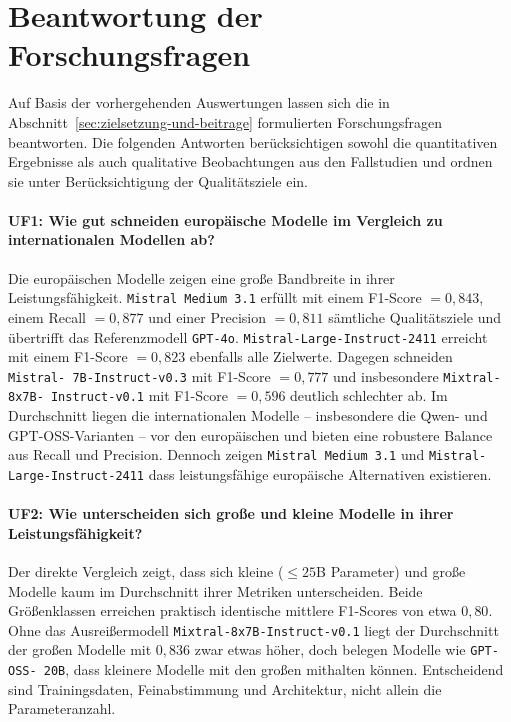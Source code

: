 \section{Beantwortung der Forschungsfragen}\label{sec:antworten-auf-forschungsfragen}

Auf Basis der vorhergehenden Auswertungen lassen sich die in Abschnitt~\ref{sec:zielsetzung-und-beitrage} formulierten Forschungsfragen beantworten. Die folgenden Antworten berücksichtigen sowohl die quantitativen Ergebnisse als auch qualitative Beobachtungen aus den Fallstudien und ordnen sie unter Berücksichtigung der Qualitätsziele ein.

\paragraph{UF1: Wie gut schneiden europäische Modelle im Vergleich zu internationalen Modellen ab?}

Die europäischen Modelle zeigen eine große Bandbreite in ihrer Leistungsfähigkeit. \texttt{Mistral Medium 3.1} erfüllt mit einem F1-Score $= 0{,}843$, einem Recall $= 0{,}877$ und einer Precision $= 0{,}811$ sämtliche Qualitätsziele und übertrifft das Referenzmodell \texttt{GPT-4o}. \texttt{Mistral-Large-Instruct-2411} erreicht mit einem F1-Score $= 0{,}823$ ebenfalls alle Zielwerte. Dagegen schneiden \texttt{Mistral-\linebreak~7B-Instruct-v0.3} mit F1-Score $= 0{,}777$ und insbesondere \texttt{Mixtral-8x7B-\linebreak~Instruct-v0.1} mit F1-Score $= 0{,}596$ deutlich schlechter ab. Im Durchschnitt liegen die internationalen Modelle – insbesondere die Qwen- und GPT-OSS-Varianten – vor den europäischen und bieten eine robustere Balance aus Recall und Precision. Dennoch zeigen \texttt{Mistral Medium 3.1} und \texttt{Mistral-Large-Instruct-2411} dass leistungsfähige europäische Alternativen existieren.

\paragraph{UF2: Wie unterscheiden sich große und kleine Modelle in ihrer Leistungsfähigkeit?}

Der direkte Vergleich zeigt, dass sich kleine ($\leq 25$B Parameter) und große Modelle kaum im Durchschnitt ihrer Metriken unterscheiden. Beide Größenklassen erreichen praktisch identische mittlere F1-Scores von etwa $0{,}80$. Ohne das Ausreißermodell \texttt{Mixtral-8x7B-Instruct-v0.1} liegt der Durchschnitt der großen Modelle mit $0{,}836$ zwar etwas höher, doch belegen Modelle wie \texttt{GPT-OSS-\linebreak~20B}, dass kleinere Modelle mit den großen mithalten können. Entscheidend sind Trainingsdaten, Feinabstimmung und Architektur, nicht allein die Parameteranzahl.

